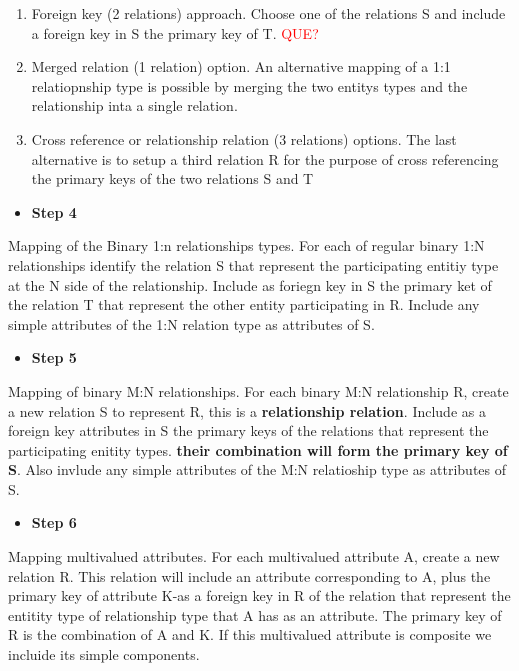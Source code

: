 \begin{enumerate}
	\item Foreign key (2 relations) approach. Choose one of the relations S and include a foreign key in S the primary key of T. \textcolor{red}{QUE?} 
	\item Merged relation (1 relation) option. An alternative mapping of a 1:1 relatiopnship type is possible by merging the two entitys types and the relationship inta a single relation.
	\item Cross reference or relationship relation (3 relations) options. The last alternative is to setup a third relation R for the purpose of cross referencing the primary keys of the two relations S and T 
\end{enumerate}

\begin{itemize}
	\item \textbf{Step 4}
\end{itemize}
Mapping of the Binary 1:n relationships types. For each of regular binary 1:N relationships identify the relation S that represent the participating entitiy type at the N side of the relationship. Include as foriegn key in S the primary ket of the relation T that represent the other entity participating in R. Include any simple attributes of the 1:N relation type as attributes of S.

\begin{itemize}
	\item \textbf{Step 5}
\end{itemize}
Mapping of binary M:N relationships. For each binary M:N relationship R, create a new relation S to represent R, this is a \textbf{relationship relation}. Include as a foreign key attributes in S the primary keys of the relations that represent the participating enitity types. \textbf{their combination will form the primary key of S}. Also invlude any simple attributes of the M:N relatioship type as attributes of S.

\begin{itemize}
	\item \textbf{Step 6}
\end{itemize}
Mapping multivalued attributes. For each multivalued attribute A, create a new relation R. This relation will include an attribute corresponding to A, plus the primary key of attribute K-as a foreign key in R of the relation that represent the entitity type of relationship type that A has as an attribute. The primary key of R is the combination of A and K. If this multivalued attribute is composite we incluide its simple components. 

